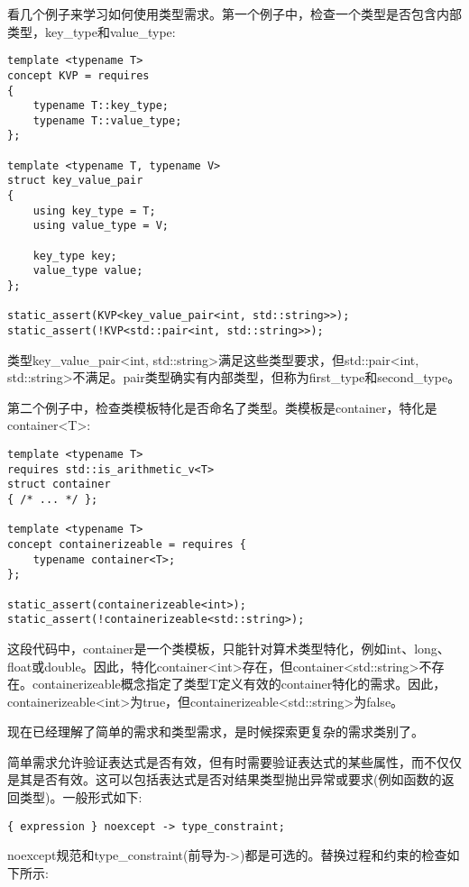 看几个例子来学习如何使用类型需求。第一个例子中，检查一个类型是否包含内部类型，key\_type和value\_type:

\begin{lstlisting}[style=styleCXX]
template <typename T>
concept KVP = requires
{
	typename T::key_type;
	typename T::value_type;
};

template <typename T, typename V>
struct key_value_pair
{
	using key_type = T;
	using value_type = V;
	
	key_type key;
	value_type value;
};

static_assert(KVP<key_value_pair<int, std::string>>);
static_assert(!KVP<std::pair<int, std::string>>);
\end{lstlisting}

类型key\_value\_pair<int, std::string>满足这些类型要求，但std::pair<int, std::string>不满足。pair类型确实有内部类型，但称为first\_type和second\_type。

第二个例子中，检查类模板特化是否命名了类型。类模板是container，特化是container<T>:

\begin{lstlisting}[style=styleCXX]
template <typename T>
requires std::is_arithmetic_v<T>
struct container
{ /* ... */ };

template <typename T>
concept containerizeable = requires {
	typename container<T>;
};

static_assert(containerizeable<int>);
static_assert(!containerizeable<std::string>);
\end{lstlisting}

这段代码中，container是一个类模板，只能针对算术类型特化，例如int、long、float或double。因此，特化container<int>存在，但container<std::string>不存在。containerizeable概念指定了类型T定义有效的container特化的需求。因此，containerizeable<int>为true，但containerizeable<std::string>为false。

现在已经理解了简单的需求和类型需求，是时候探索更复杂的需求类别了。


简单需求允许验证表达式是否有效，但有时需要验证表达式的某些属性，而不仅仅是其是否有效。这可以包括表达式是否对结果类型抛出异常或要求(例如函数的返回类型)。一般形式如下:

\begin{lstlisting}[style=styleCXX]
{ expression } noexcept -> type_constraint;
\end{lstlisting}

noexcept规范和type\_constraint(前导为->)都是可选的。替换过程和约束的检查如下所示:

